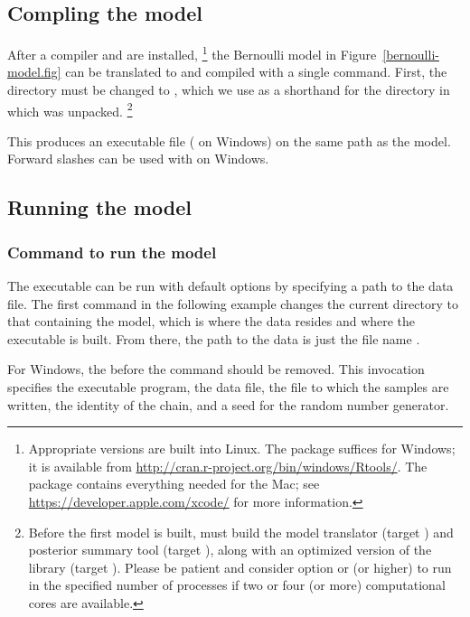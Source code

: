 \documentclass[article]{jss}
\begin{document}
\subsection{Compling the model}

After a  compiler and  are installed,%
%
\footnote{Appropriate versions are built into Linux. The 
  package suffices for Windows; it is available from
  \url{http://cran.r-project.org/bin/windows/Rtools/}.  The
   package contains everything needed for the Mac; see
  \url{https://developer.apple.com/xcode/} for more information.}
%
the Bernoulli model in Figure~\ref{bernoulli-model.fig} can be
translated to  and compiled with a single command.
First, the directory must be changed to , which we use as
a shorthand for the directory in which  was unpacked.%
%
\footnote{Before the first model is built,  must build the
  model translator (target ) and posterior summary tool
  (target ), along with an optimized version of the
   library (target ).  Please be patient
  and consider  option  or  (or higher)
  to run in the specified number of processes if two or four (or more)
  computational cores are available.}
%
\begin{CodeChunk}
\end{CodeChunk}
%
This produces an executable file 
( on Windows) on the same path as the model.
Forward slashes can be used with  on Windows.

\subsection{Running the model}

\subsubsection{Command to run the model}

The executable can be run with default options by specifying a path to
the data file.  The first command in the following example changes the
current directory to that containing the model, which is where the
data resides and where the executable is built.  From there, the path
to the data is just the file name .
%
\begin{CodeChunk}
{\small
{}
}
\end{CodeChunk}
%
For Windows, the  before the command should be removed.  This
invocation specifies the executable program, the data file, the file
to which the samples are written, the identity of the chain, and a
seed for the random number generator.
\end{document}
